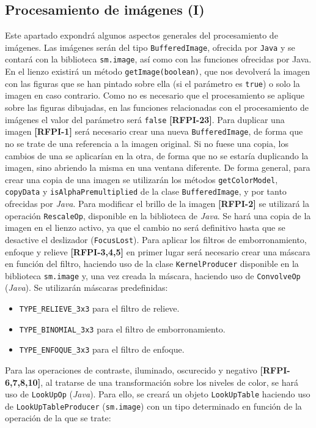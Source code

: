 \subsection{Procesamiento de imágenes (I)}
Este apartado expondrá algunos aspectos generales del procesamiento de imágenes.
\vskip0.3cm
Las imágenes serán del tipo \texttt{BufferedImage}, ofrecida por \texttt{Java} y se contará con la biblioteca \texttt{sm.image}, así como con las funciones ofrecidas por Java. En el lienzo existirá un método \texttt{getImage(boolean)}, que nos devolverá la imagen con las figuras que se han pintado sobre ella (si el parámetro es \texttt{true}) o solo la imagen en caso contrario. Como no es necesario que el procesamiento se aplique sobre las figuras dibujadas, en las funciones relacionadas con el procesamiento de imágenes el valor del parámetro será \texttt{false} \textbf{[RFPI-23]}.
\vskip0.3cm
Para duplicar una imagen \textbf{[RFPI-1]} será necesario crear una nueva \texttt{BufferedImage}, de forma que no se trate de una referencia a la imagen original. Si no fuese una copia, los cambios de una se aplicarían en la otra, de forma que no se estaría duplicando la imagen, sino abriendo la misma en una ventana diferente.\vskip0.3cm
De forma general, para crear una copia de una imagen se utilizarán los métodos \texttt{getColorModel}, \texttt{copyData} y \texttt{isAlphaPremultiplied} de la clase \texttt{BufferedImage}, y por tanto ofrecidas por \textit{Java}.
\vskip0.3cm
Para modificar el brillo de la imagen \textbf{[RFPI-2]} se utilizará la operación \texttt{RescaleOp}, disponible en la biblioteca de \textit{Java}. Se hará una copia de la imagen en el lienzo activo, ya que el cambio no será definitivo hasta que se desactive el deslizador (\texttt{FocusLost}).
\vskip0.3cm
Para aplicar los filtros de emborronamiento, enfoque y relieve \textbf{[RFPI-3,4,5]} en primer lugar será necesario crear una máscara en función del filtro, haciendo uso de la clase \texttt{KernelProducer} disponible en la biblioteca \texttt{sm.image} y, una vez creada la máscara, haciendo uso de \texttt{ConvolveOp} (\textit{Java}). Se utilizarán máscaras predefinidas:
\begin{itemize}
\item{\texttt{TYPE\_RELIEVE\_3x3} para el filtro de relieve.}
\item{\texttt{TYPE\_BINOMIAL\_3x3} para el filtro de emborronamiento.}
\item{\texttt{TYPE\_ENFOQUE\_3x3} para el filtro de enfoque.}
\end{itemize}
\vskip0.3cm
Para las operaciones de contraste, iluminado, oscurecido y negativo \textbf{[RFPI-6,7,8,10]}, al tratarse de una transformación sobre los niveles de color, se hará uso de \texttt{LookUpOp} (\textit{Java}). Para ello, se creará un objeto \texttt{LookUpTable} haciendo uso de \texttt{LookUpTableProducer} (\texttt{sm.image})  con un tipo determinado en función de la operación de la que se trate:
